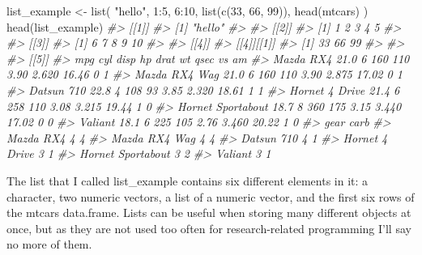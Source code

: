 \documentclass[
]{krantz}
\makeatletter
\newenvironment{Shaded}{\begin{snugshade}}{\end{snugshade}}
\newcommand{\CommentTok}[1]{\textcolor[rgb]{0.37,0.37,0.37}{\textit{#1}}}
\newcommand{\DecValTok}[1]{\textcolor[rgb]{0.06,0.06,0.06}{#1}}
\newcommand{\FunctionTok}[1]{\textcolor[rgb]{0,0,0}{#1}}
\newcommand{\NormalTok}[1]{#1}
\newcommand{\OtherTok}[1]{\textcolor[rgb]{0.37,0.37,0.37}{#1}}
\newcommand{\SpecialCharTok}[1]{\textcolor[rgb]{0,0,0}{#1}}
\newcommand{\StringTok}[1]{\textcolor[rgb]{0.5,0.5,0.5}{#1}}
\newenvironment{kframe}{%
\medskip{}
\setlength{\fboxsep}{.8em}
 \def\at@end@of@kframe{}%
 \ifinner\ifhmode%
  \def\at@end@of@kframe{\end{minipage}}%
  \begin{minipage}{\columnwidth}%
 \fi\fi%
 \def\FrameCommand##1{\hskip\@totalleftmargin \hskip-\fboxsep
 \colorbox{shadecolor}{##1}\hskip-\fboxsep
     \hskip-\linewidth \hskip-\@totalleftmargin \hskip\columnwidth}%
 \MakeFramed {\advance\hsize-\width
   \@totalleftmargin\z@ \linewidth\hsize
   \@setminipage}}%
 {\par\unskip\endMakeFramed%
 \at@end@of@kframe}
\renewenvironment{Shaded}{\begin{kframe}}{\end{kframe}}
\makeatother
\begin{document}
\begin{Shaded}
\begin{Highlighting}[]
\NormalTok{list\_example }\OtherTok{\textless{}{-}} \FunctionTok{list}\NormalTok{(}
  \StringTok{"hello"}\NormalTok{,}
  \DecValTok{1}\SpecialCharTok{:}\DecValTok{5}\NormalTok{,}
  \DecValTok{6}\SpecialCharTok{:}\DecValTok{10}\NormalTok{,}
  \FunctionTok{list}\NormalTok{(}\FunctionTok{c}\NormalTok{(}\DecValTok{33}\NormalTok{, }\DecValTok{66}\NormalTok{, }\DecValTok{99}\NormalTok{)),}
  \FunctionTok{head}\NormalTok{(mtcars)}
\NormalTok{)}
\FunctionTok{head}\NormalTok{(list\_example)}
\CommentTok{\#\textgreater{} [[1]]}
\CommentTok{\#\textgreater{} [1] "hello"}
\CommentTok{\#\textgreater{} }
\CommentTok{\#\textgreater{} [[2]]}
\CommentTok{\#\textgreater{} [1] 1 2 3 4 5}
\CommentTok{\#\textgreater{} }
\CommentTok{\#\textgreater{} [[3]]}
\CommentTok{\#\textgreater{} [1]  6  7  8  9 10}
\CommentTok{\#\textgreater{} }
\CommentTok{\#\textgreater{} [[4]]}
\CommentTok{\#\textgreater{} [[4]][[1]]}
\CommentTok{\#\textgreater{} [1] 33 66 99}
\CommentTok{\#\textgreater{} }
\CommentTok{\#\textgreater{} }
\CommentTok{\#\textgreater{} [[5]]}
\CommentTok{\#\textgreater{}                    mpg cyl disp  hp drat    wt  qsec vs am}
\CommentTok{\#\textgreater{} Mazda RX4         21.0   6  160 110 3.90 2.620 16.46  0  1}
\CommentTok{\#\textgreater{} Mazda RX4 Wag     21.0   6  160 110 3.90 2.875 17.02  0  1}
\CommentTok{\#\textgreater{} Datsun 710        22.8   4  108  93 3.85 2.320 18.61  1  1}
\CommentTok{\#\textgreater{} Hornet 4 Drive    21.4   6  258 110 3.08 3.215 19.44  1  0}
\CommentTok{\#\textgreater{} Hornet Sportabout 18.7   8  360 175 3.15 3.440 17.02  0  0}
\CommentTok{\#\textgreater{} Valiant           18.1   6  225 105 2.76 3.460 20.22  1  0}
\CommentTok{\#\textgreater{}                   gear carb}
\CommentTok{\#\textgreater{} Mazda RX4            4    4}
\CommentTok{\#\textgreater{} Mazda RX4 Wag        4    4}
\CommentTok{\#\textgreater{} Datsun 710           4    1}
\CommentTok{\#\textgreater{} Hornet 4 Drive       3    1}
\CommentTok{\#\textgreater{} Hornet Sportabout    3    2}
\CommentTok{\#\textgreater{} Valiant              3    1}
\end{Highlighting}
\end{Shaded}

The list that I called list\_example contains six different
elements in it: a character, two numeric vectors, a list of
a numeric vector, and the first six rows of the mtcars
data.frame. Lists can be useful when storing many different
objects at once, but as they are not used too often for
research-related programming I'll say no more of them.
\end{document}
